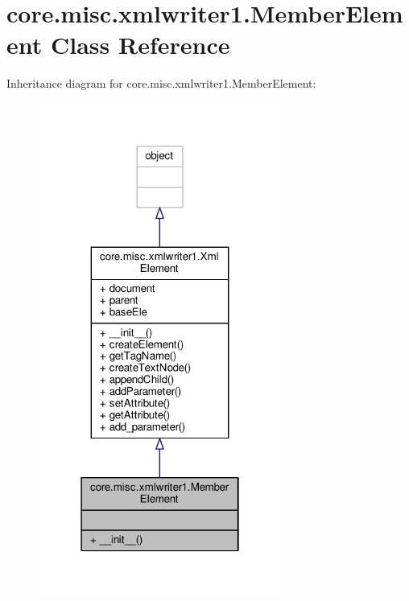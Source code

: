 \hypertarget{classcore_1_1misc_1_1xmlwriter1_1_1_member_element}{\section{core.\+misc.\+xmlwriter1.\+Member\+Element Class Reference}
\label{classcore_1_1misc_1_1xmlwriter1_1_1_member_element}
}


Inheritance diagram for core.\+misc.\+xmlwriter1.\+Member\+Element\+:
\nopagebreak
\begin{figure}[H]
\begin{center}
\leavevmode
\includegraphics[width=226pt]{classcore_1_1misc_1_1xmlwriter1_1_1_member_element__inherit__graph}
\end{center}
\end{figure}


